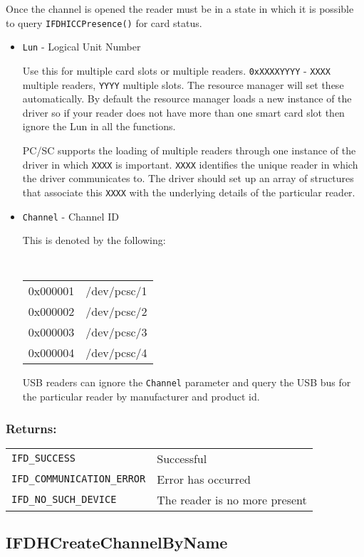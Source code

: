 \documentclass[a4paper,12pt]{article}
\newcommand{\returns}{\subsubsection{Returns:}}
\begin{document}
Once the channel is opened the reader must be in a state in which it is
possible to query \texttt{IFDHICCPresence()} for card status.

\begin{itemize}
\item \texttt{Lun} - Logical Unit Number

Use this for multiple card slots or multiple readers.
\texttt{0xXXXXYYYY} - \texttt{XXXX} multiple readers, \texttt{YYYY}
multiple slots. The resource manager will set these automatically. By
default the resource manager loads a new instance of the driver so if
your reader does not have more than one smart card slot then ignore the
Lun in all the functions.

PC/SC supports the loading of multiple readers through one instance of
the driver in which \texttt{XXXX} is important. \texttt{XXXX} identifies
the unique reader in which the driver communicates to. The driver should
set up an array of structures that associate this \texttt{XXXX} with the
underlying details of the particular reader.

\item \texttt{Channel} - Channel ID

This is denoted by the following:

{\tt
\begin{tabular}{ll}
0x000001 & /dev/pcsc/1\\
0x000002 & /dev/pcsc/2\\
0x000003 & /dev/pcsc/3\\
0x000004 & /dev/pcsc/4\\
\end{tabular}
}

USB readers can ignore the \texttt{Channel} parameter and query the USB
bus for the particular reader by manufacturer and product id.

\end{itemize}

\returns

\begin{tabular}{ll}
\texttt{IFD\_SUCCESS} & Successful\\
\texttt{IFD\_COMMUNICATION\_ERROR} & Error has occurred\\
\texttt{IFD\_NO\_SUCH\_DEVICE} & The reader is no more present\\
\end{tabular}


\subsection{IFDHCreateChannelByName}
\label{IFDHCreateChannelByName}
\end{document}
